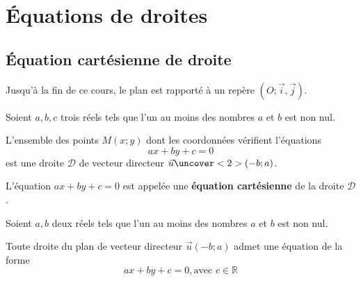 \documentclass{beamer}
\begin{document}
   \section{\'Equations de droites}
   
   
   
   \subsection{\'Equation cartésienne de droite}
   
    \begin{frame}
    
    Jusqu'à la fin de ce cours, le plan est rapporté à un repère $(O;\vec{i},\vec{j})$.
    
   \begin{theorem}

    Soient $a,b,c$ trois réels tels que l'un au moins des nombres $a$ et $b$ est non nul.
    
    L'ensemble des points $M(x;y)$ dont les coordonnées vérifient l'équations
    $$ax+by+c=0$$ est une droite $\mathcal{D}$ de vecteur directeur $\vec{u}\uncover<2>{(-b;a)}$.
    
    L'équation $ax+by+c=0$ est appelée une \textbf{équation cartésienne} de la droite $\mathcal{D}$.
   
   \end{theorem}

  \end{frame}
   
   \begin{frame}
   
     \begin{theorem}

    Soient $a,b$ deux réels tels que l'un au moins des nombres $a$ et $b$ est non nul.
    
    Toute droite du plan de vecteur directeur $\vec{u}(-b;a)$ admet une équation de la forme 
    $$ax+by+c=0, \textrm{avec $c \in \mathbb{R}$}$$
   
   \end{theorem}

  \end{frame}
  
\end{document}
